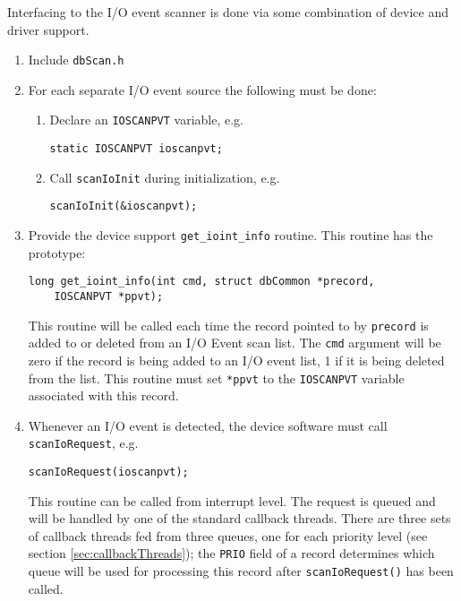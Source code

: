 
Interfacing to the I/O event scanner is done via some combination of device and driver support.

\begin{enumerate}
\item Include \verb|dbScan.h|

\item For each separate I/O event source the following must be done:

\begin{enumerate}

\item Declare an \verb|IOSCANPVT| variable, e.g.

\begin{verbatim}
static IOSCANPVT ioscanpvt;
\end{verbatim}

\item Call \verb|scanIoInit| during initialization, e.g.

\begin{verbatim}
scanIoInit(&ioscanpvt);
\end{verbatim}
\end{enumerate}

\item Provide the device support \verb|get_ioint_info| routine.
This routine has the prototype:

\begin{verbatim}
long get_ioint_info(int cmd, struct dbCommon *precord,
    IOSCANPVT *ppvt);
\end{verbatim}

This routine will be called each time the record pointed to by \verb|precord| is added to or deleted from an I/O Event scan list.
The \verb|cmd| argument will be zero if the record is being added to an I/O event list, 1 if it is being deleted from the list.
This routine must set \verb|*ppvt| to the \verb|IOSCANPVT| variable associated with this record.

\item Whenever an I/O event is detected, the device software must call \verb|scanIoRequest|, e.g.

\begin{verbatim}
scanIoRequest(ioscanpvt);
\end{verbatim}

This routine can be called from interrupt level.
The request is queued and will be handled by one of the standard callback threads.
There are three sets of callback threads fed from three queues, one for each priority level (see section \ref{sec:callbackThreads}); the \verb|PRIO| field of a record determines which queue will be used for processing this record after \verb|scanIoRequest()| has been called.


\end{enumerate}
